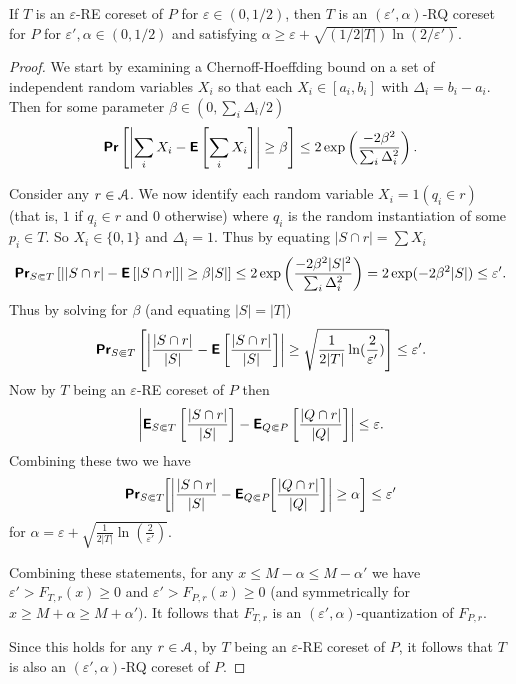 \documentclass[11pt]{myclass}
\newcommand{\eps}{\varepsilon}
\newcommand{\Eu}[1]{\ensuremath{\EuScript{#1}}}
\newcommand{\E}{\textbf{\textsf{E}}}
\renewcommand{\Pr}{\textbf{\textsf{Pr}}}
\newcommand{\RE}{\textsf{RE}\xspace}
\newcommand{\RQ}{\textsf{RQ}\xspace}
\begin{document}
\begin{theorem}
If $T$ is an $\eps$-\RE coreset of $P$ for $\eps \in (0,1/2)$, 
then  $T$ is an $(\eps',\alpha)$-\RQ coreset for $P$ for $\eps',\alpha \in (0,1/2)$ and satisfying
$\alpha \geq \eps +  \sqrt{(1/2|T|) \ln(2/\eps')}$.  
\label{thm:RQ-CLM}
\end{theorem}
\begin{proof}
We start by examining a Chernoff-Hoeffding bound on a set of independent random variables  $X_i$ so that each $X_i \in [a_i, b_i]$ with $\Delta_i = b_i - a_i$.  Then for some parameter $\beta \in (0, \sum_i \Delta_i/2)$ 
\[
\Pr \left[ \left| \sum_i X_i - \E\left[\sum_i X_i\right] \right| \geq \beta \right] 
\leq 
2 \exp \left(\frac{-2\beta^2}{\sum_i \Delta_i^2}\right).
\]

Consider any $r \in \Eu{A}$.  
We now identify each random variable $X_i = 1 (q_i \in r)$ (that is, $1$ if $q_i \in r$ and $0$ otherwise) where $q_i$ is the random instantiation of some $p_i \in T$.  So $X_i \in \{0,1\}$ and $\Delta_i = 1$.  
Thus by equating $|S \cap r| = \sum X_i$
\begin{align*}
\Pr_{S \Subset T} \left[ \left| |S \cap r| - \E\left[|S \cap r|\right] \right| \geq \beta |S| \right]  \leq 
2 \exp \left(\frac{-2\beta^2 |S|^2}{\sum_i \Delta_i^2}\right)
 = 2 \exp(-2 \beta^2 |S|) \leq \eps'.
\end{align*}
Thus by solving for $\beta$ (and equating $|S| = |T|$)
\[
\Pr_{S \Subset T} \left[ \left| \frac{|S \cap r|}{|S|}  - \E\left[\frac{|S \cap r|}{|S|}\right] \right| \geq \sqrt{\frac{1}{2|T|} \ln( \frac{2}{\eps'})}\right] \leq \eps'.
\]
Now by $T$ being an $\eps$-\RE coreset of $P$ then 
\[
\left| \E_{S \Subset T}\left[\frac{|S \cap r|}{|S|}\right] - \E_{Q \Subset P}\left[\frac{|Q \cap r|}{|Q|} \right] \right| \leq \eps.  
\]
Combining these two we have
\[
\Pr_{S \Subset T}  \hspace{-1mm} \left[ \left| \frac{|S \cap r|}{|S|}  - \E_{Q \Subset P} \hspace{-1mm} \left[\frac{|Q \cap r|}{|Q|}\right] \right| \geq \alpha \right] \leq \eps'
\]
for $\alpha = \eps + \sqrt{\frac{1}{2|T|} \ln( \frac{2}{\eps'})}$.  



Combining these statements, for any $x \leq M-\alpha \leq M - \alpha'$ 
we have 
$\eps' > F_{T,r}(x) \geq 0$ and $\eps' > F_{P,r}(x) \geq 0$ (and symmetrically for $x \geq M+\alpha \geq M+\alpha')$.  
It follows that $F_{T,r}$ is an $(\eps',\alpha)$-quantization of $F_{P,r}$.  

Since this holds for any $r \in \Eu{A}$, by $T$ being an $\eps$-\RE coreset of $P$, it follows that $T$ is also an $(\eps', \alpha)$-\RQ coreset of $P$.  
\end{proof}
\end{document}
